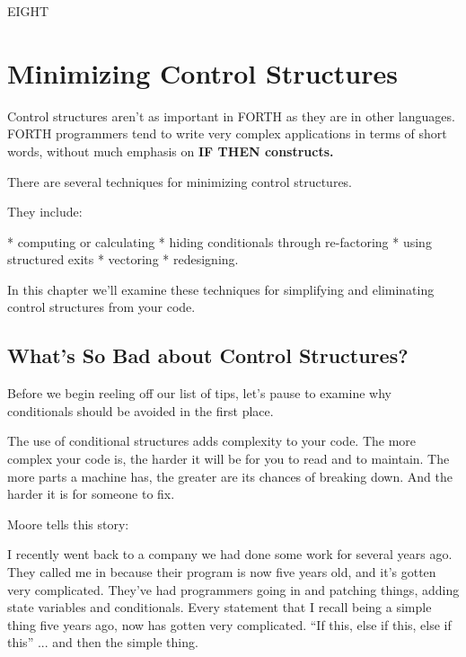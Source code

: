
EIGHT

\chapter{Minimizing Control Structures}

Control structures aren't as important in FORTH as they are in other
languages. FORTH programmers tend to write very complex applications
in terms of short words, without much emphasis on \bf{IF THEN}
constructs.

There are several techniques for minimizing control structures.

They include:

* computing or calculating
* hiding conditionals through re-factoring
* using structured exits
* vectoring
* redesigning.

In this chapter we'll examine these techniques for simplifying and
eliminating control structures from your code.

\section{What's So Bad about Control Structures?}

Before we begin reeling off our list of tips, let's pause to examine why
conditionals should be avoided in the first place.

The use of conditional structures adds complexity to your code. The
more complex your code is, the harder it will be for you to read and to
maintain. The more parts a machine has, the greater are its chances of
breaking down. And the harder it is for someone to fix.

Moore tells this story:

I recently went back to a company we had done some work for several years
ago. They called me in because their program is now five years old, and it's
gotten very complicated. They've had programmers going in and patching
things, adding state variables and conditionals. Every statement that I
recall being a simple thing five years ago, now has gotten very complicated.
``If this, else if this, else if this'' ... and then the simple thing.

